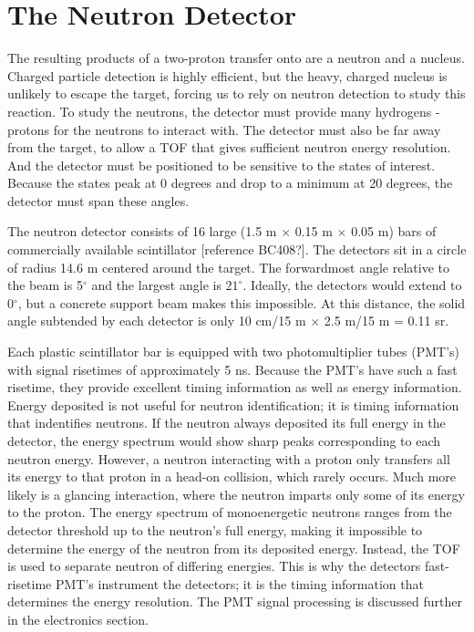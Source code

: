 \section{The Neutron Detector}

The resulting products of a two-proton transfer onto  are a neutron and a  nucleus.  Charged particle detection is highly efficient, but the heavy, charged  nucleus is unlikely to escape the target, forcing us to rely on neutron detection to study this reaction. To study the neutrons, the detector must provide many hydrogens - protons for the neutrons to interact with.  The detector must also be far away from the target, to allow a TOF that gives sufficient neutron energy resolution.  And the detector must be positioned to be sensitive to the \zp states of interest.  Because the \zp states peak at 0 degrees and drop to a minimum at 20 degrees, the detector must span these angles.

The neutron detector consists of 16 large (1.5 m $\times$ 0.15 m $\times$ 0.05 m) bars of commercially available scintillator [reference BC408?].  The detectors sit in a circle of radius 14.6 m centered around the target.  The forwardmost angle relative to the beam is 5$^{\circ}$ and the largest angle is $21^{\circ}$.  Ideally, the detectors would extend to 0$^{\circ}$, but a concrete support beam makes this impossible.  At this distance, the solid angle subtended by each detector is only 10 cm/15 m $\times$ 2.5 m/15 m = 0.11 sr.


Each plastic scintillator bar is equipped with two photomultiplier tubes (PMT's) with signal risetimes of approximately 5 ns.  Because the PMT's have such a fast risetime, they provide excellent timing information as well as energy information.  Energy deposited is not useful for neutron identification; it is timing information that indentifies neutrons.  If the neutron always deposited its full energy in the detector, the energy spectrum would show sharp peaks corresponding to each neutron energy.  However, a neutron interacting with a proton only transfers all its energy to that proton in a head-on collision, which rarely occurs.  Much more likely is a glancing interaction, where the neutron imparts only some of its energy to the proton.  The energy spectrum of monoenergetic neutrons ranges from the detector threshold up to the neutron's full energy, making it impossible to determine the energy of the neutron from its deposited energy.  Instead, the TOF is used to separate neutron of differing energies.  This is why the detectors fast-risetime PMT's instrument the detectors; it is the timing information that determines the energy resolution.  The PMT signal processing is discussed further in the electronics section.

